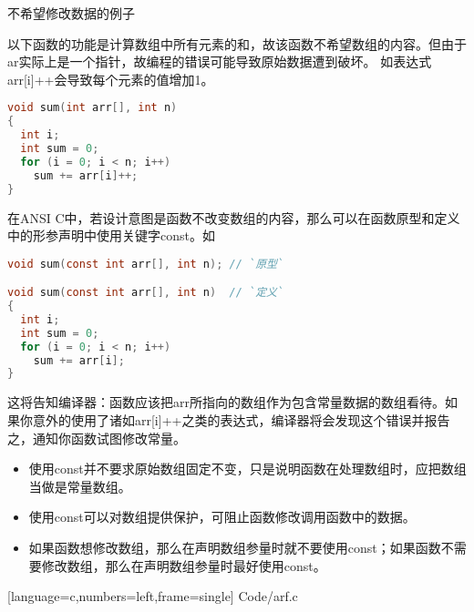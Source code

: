 \begin{frame}[fragile]\ft{\secname}
\begin{center}
不希望修改数据的例子
\end{center}
以下函数的功能是计算数组中所有元素的和，故该函数不希望数组的内容。但由于{\tf ar}实际上是一个指针，故编程的错误可能导致原始数据遭到破坏。
如表达式{\tf arr[i]++}会导致每个元素的值增加1。
\begin{lstlisting}[language=c,backgroundcolor=\color{red!20}]
void sum(int arr[], int n)
{
  int i;
  int sum = 0;
  for (i = 0; i < n; i++)
    sum += arr[i]++;
}
\end{lstlisting}  
\end{frame}

\begin{frame}[fragile]
在ANSI C中，若设计意图是函数不改变数组的内容，那么可以在函数原型和定义中的形参声明中使用关键字{\tf const}。如
\begin{lstlisting}[language=c,backgroundcolor=\color{red!20}]
void sum(const int arr[], int n); // `原型`

void sum(const int arr[], int n)  // `定义`
{
  int i;
  int sum = 0;
  for (i = 0; i < n; i++)
    sum += arr[i];
}
\end{lstlisting} 
这将告知编译器：函数应该把{\tf arr}所指向的数组作为包含常量数据的数组看待。如果你意外的使用了诸如{\tf arr[i]++}之类的表达式，编译器将会发现这个错误并报告之，通知你函数试图修改常量。
\end{frame}

\begin{frame}[fragile]
\begin{itemize}
\item 使用{\tf const}并不要求原始数组固定不变，只是说明函数在处理数组时，应把数组当做是常量数组。\\[0.1in]
\item 使用{\tf const}可以对数组提供保护，可阻止函数修改调用函数中的数据。\\[0.1in]
\item 如果函数想修改数组，那么在声明数组参量时就不要使用{\tf const}；如果函数不需要修改数组，那么在声明数组参量时最好使用{\tf const}。
\end{itemize}
\end{frame}

\begin{frame}

[language=c,numbers=left,frame=single]
{Code/arf.c}
\end{frame}


